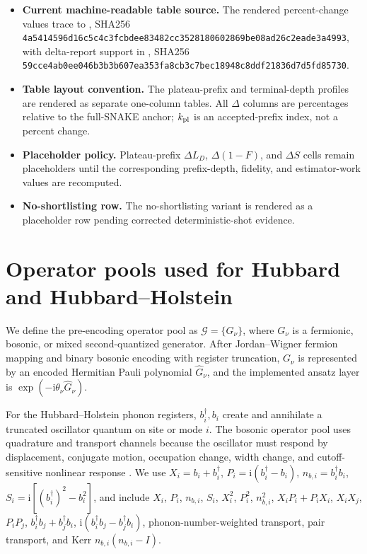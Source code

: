 \documentclass[
  reprint,
  amsmath,
  amssymb,
  aps,
  pra,
  nofootinbib,
  superscriptaddress,
  floatfix
]{revtex4-2}
\newcommand{\Gset}{\mathcal{G}}
\newcommand{\ii}{\mathrm{i}}
\begin{document}
\begin{itemize}
\item \textbf{Current machine-readable table source.} The rendered percent-change values trace to , SHA256 \texttt{4a5414596d16c5c4c3fcbdee83482cc3528180602869be08ad26c2eade3a4993}, with delta-report support in , SHA256 \texttt{59cce4ab0ee046b3b3b607ea353fa8cb3c7bec18948c8ddf21836d7d5fd85730}.
\item \textbf{Table layout convention.} The plateau-prefix and terminal-depth profiles are rendered as separate one-column tables. All \(\Delta\) columns are percentages relative to the full-SNAKE anchor; \(k_{\rm pl}\) is an accepted-prefix index, not a percent change.
\item \textbf{Placeholder policy.} Plateau-prefix \(\Delta L_D\), \(\Delta(1-F)\), and \(\Delta S\) cells remain placeholders until the corresponding prefix-depth, fidelity, and estimator-work values are recomputed.
\item \textbf{No-shortlisting row.} The no-shortlisting variant is rendered as a placeholder row pending corrected deterministic-shot evidence.
\end{itemize}

\fi







\section{Operator pools used for Hubbard and Hubbard--Holstein}
\label{app:pools}

We define the pre-encoding operator pool as \(\Gset=\{G_\nu\}\), where
\(G_\nu\) is a fermionic, bosonic, or mixed second-quantized generator.  After
Jordan--Wigner fermion mapping and binary bosonic encoding with register
truncation, \(G_\nu\) is represented by an encoded Hermitian Pauli polynomial
\(\widehat G_\nu\), and the implemented ansatz layer is
\(\exp(-\ii\theta_\nu\widehat G_\nu)\).

For the Hubbard--Holstein phonon registers, \(b_i^\dagger,b_i\) create and annihilate a truncated
oscillator quantum on site or mode \(i\).  The bosonic operator pool uses
quadrature and transport channels because the oscillator must respond by
displacement, conjugate motion, occupation change, width change, and
cutoff-sensitive nonlinear response
\cite{Sawaya2020,Li2023,Dutta2024BosonicChemistry,Peng2025BosonHamiltonians}.
We use \(X_i=b_i+b_i^\dagger\), \(P_i=\ii(b_i^\dagger-b_i)\),
\(n_{b,i}=b_i^\dagger b_i\), \(S_i=\ii[(b_i^\dagger)^2-b_i^2]\),
and include \(X_i\), \(P_i\), \(n_{b,i}\), \(S_i\), \(X_i^2\), \(P_i^2\),
\(n_{b,i}^2\), \(X_iP_i+P_iX_i\), \(X_iX_j\), \(P_iP_j\),
\(b_i^\dagger b_j+b_j^\dagger b_i\),
\(\ii(b_i^\dagger b_j-b_j^\dagger b_i)\), phonon-number-weighted transport,
pair transport, and Kerr \(n_{b,i}(n_{b,i}-I)\).
\end{document}
